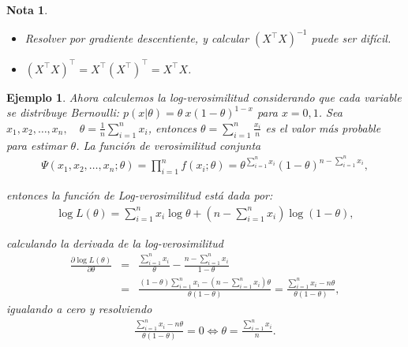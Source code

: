 \documentclass[12pt]{article}
\newtheorem{Ejem}{Ejemplo}[section]
\newtheorem{Note}{Nota}%
\begin{document}
\begin{Note}
\begin{itemize}
\item Resolver por gradiente descentiente, y calcular $ (X^{\top} X)^{-1}$ puede ser dif\'icil.
\item $(X^{\top} X)^{\top}=X^{\top}(X^{\top})^{\top}=X^{\top} X$.
\end{itemize}
\end{Note}

\begin{Ejem}
Ahora calculemos la log-verosimilitud considerando que cada variable se distribuye Bernoulli: $p\left(x|\theta\right)=\theta~{x}\left(1-\theta\right)^{1-x}$ para $x=0,1$.
Sea  $x_1, x_2, \dots, x_n, \quad \theta = \frac{1}{n} \sum_{i=1}^{n} x_i$, entonces $\theta=\sum_{i=1}^{n}\frac{x_{i}}{n}$ es el valor m\'as probable para estimar $\theta$. La función de verosimilitud conjunta
\begin{eqnarray}
\Psi(x_1, x_2, \dots, x_n; \theta) = \prod_{i=1}^{n} f(x_i; \theta)= \theta^{\sum_{i=1}^{n} x_i} (1 - \theta)^{n - \sum_{i=1}^{n} x_i},
\end{eqnarray}

entonces la funci\'on de  Log-verosimilitud est\'a dada por:
\begin{eqnarray}
\log L(\theta) = \sum_{i=1}^{n} x_i \log \theta + (n - \sum_{i=1}^{n} x_i) \log (1 - \theta),
\end{eqnarray}

calculando la derivada de la log-verosimilitud
\begin{eqnarray}
\frac{\partial \log L(\theta)}{\partial \theta} &=& \frac{\sum_{i=1}^{n} x_i}{\theta} - \frac{n - \sum_{i=1}^{n}x_i}{1 - \theta}\\
&=& \frac{(1 - \theta) \sum_{i=1}^{n} x_i - (n - \sum_{i=1}^{n} x_i) \theta}{\theta (1 - \theta)} = \frac{\sum_{i=1}^{n} x_i - n \theta}{\theta (1 - \theta)},
\end{eqnarray}
igualando a cero y resolviendo
\begin{eqnarray}
\frac{\sum_{i=1}^{n}x_i - n \theta}{\theta (1 - \theta)}=0\Leftrightarrow \theta =\frac{\sum_{i=1}^{n} x_{i}}{n}.
\end{eqnarray}
\end{Ejem}
\end{document}
